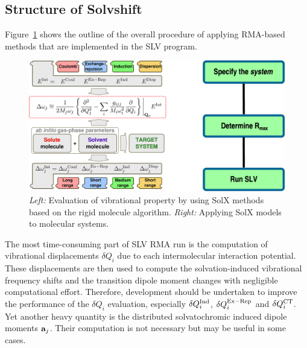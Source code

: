 \documentclass[b5paper,oneside,fleqn,11pt]{book}
\begin{document}
\begin{refsection}
\section{Structure of Solvshift}

Figure~\ref{f:slv-solefp} shows the outline of the overall procedure 
of applying RMA\hyp{}based methods that are implemented in the SLV program.
%
\begin{figure}[t!]
\centering
\setlength\fboxsep{0.4pt}
\setlength\fboxrule{0.5pt}
\includegraphics[width=0.92\linewidth]{slv-fig-2.eps}
\caption{
\emph{Left:} Evaluation of vibrational property by using SolX methods based 
             on the rigid molecule algorithm.
\emph{Right:} Applying SolX models to molecular systems.
\label{f:slv-solefp}}
\end{figure}
%
The most time\hyp{}consuming part of SLV RMA run is the computation
of vibrational displacements $\delta Q_i$ due to each intermolecular
interaction potential. These displacements are then used to compute the
solvation\hyp{}induced vibrational frequency shifts 
and the transition dipole moment changes with negligible computational effort.
Therefore, development should be undertaken to improve the
performance of the $\delta Q_i$ evaluation, especially 
$\delta Q_i^{\rm Ind}$, $\delta Q_i^{\rm Ex-Rep}$
and $\delta Q_i^{\rm CT}$. Yet another heavy quantity is
the distributed solvatochromic induced dipole moments ${\bf a}_j$.
Their computation is not necessary but may be useful in some cases.


\end{refsection}
\end{document}
